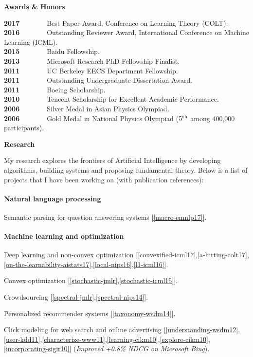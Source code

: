 \documentclass{res} %
\newenvironment{my_item}{
\begin{itemize}
  \setlength{\itemsep}{0pt}
  \setlength{\parskip}{0pt}
  \setlength{\parsep}{0pt}}
{\end{itemize}
}
\begin{document}
\begin{resume}
{\Large\bf Awards \& Honors}

\vspace{-5pt}
\textbf{2017}~~~~~~~~Best Paper Award, Conference on Learning Theory (COLT).\\
\textbf{2016}~~~~~~~~Outstanding Reviewer Award, International Conference on Machine Learning (ICML).\\
\textbf{2015}~~~~~~~~Baidu Fellowship.\\
\textbf{2013}~~~~~~~~Microsoft Research PhD Fellowship Finalist.\\
\textbf{2011}~~~~~~~~UC Berkeley EECS Department Fellowship.\\
\textbf{2011}~~~~~~~~Outstanding Undergraduate Dissertation Award.\\
\textbf{2011}~~~~~~~~Boeing Scholarship.\\
\textbf{2010}~~~~~~~~Tencent Scholarship for Excellent Academic Performance.\\
\textbf{2006}~~~~~~~~Silver Medal in Asian Physics Olympiad.\\
\textbf{2006}~~~~~~~~Gold Medal in National Physics Olympiad ($5^{\rm{th}}$ among 400,000 participants).

{\bf\Large Research}

My research explores the frontiers of Artificial Intelligence by developing algorithms, building systems and proposing fundamental theory. Below is a list of projects that I have been working on (with publication references):

\vspace{-10pt}
\paragraph{Natural language processing}
\begin{my_item}
\item Semantic parsing for question answering systems [\ref{macro-emnlp17}].
\end{my_item}

\vspace{-10pt}
\paragraph{Machine learning and optimization}
\begin{my_item}
\item Deep learning and non-convex optimization [\ref{convexified-icml17},\ref{a-hitting-colt17},\ref{on-the-learnability-aistats17},\ref{local-nips16},\ref{l1-icml16}].
\item Convex optimization [\ref{stochastic-jmlr},\ref{stochastic-icml15}].
\item Crowdsourcing [\ref{spectral-jmlr},\ref{spectral-nips14}].
\item Personalized recommender systems [\ref{taxonomy-wsdm14}].
\item Click modeling for web search and online advertising [\ref{understanding-wsdm12},\ref{user-kdd11},\ref{characterize-www11},\ref{learning-cikm10},\ref{explore-cikm10},\ref{incorporating-sigir10}] (\emph{Improved +0.8\% NDCG on Microsoft Bing}).
\end{my_item}


\end{resume}
\end{document}
